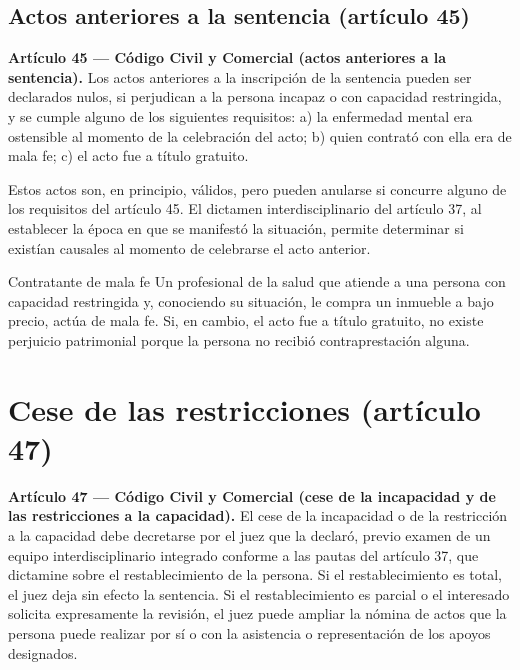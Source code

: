 \documentclass[12pt,oneside]{book}
\begin{document}
\subsection{Actos anteriores a la sentencia (artículo 45)}

\begin{important}
\textbf{Artículo 45 --- Código Civil y Comercial (actos anteriores a la sentencia).} Los actos anteriores a la inscripción de la sentencia pueden ser declarados nulos, si perjudican a la persona incapaz o con capacidad restringida, y se cumple alguno de los siguientes requisitos: a) la enfermedad mental era ostensible al momento de la celebración del acto; b) quien contrató con ella era de mala fe; c) el acto fue a título gratuito.
\end{important}

Estos actos son, en principio, válidos, pero pueden anularse si concurre alguno de los requisitos del artículo 45. El dictamen interdisciplinario del artículo 37, al establecer la época en que se manifestó la situación, permite determinar si existían causales al momento de celebrarse el acto anterior.

\begin{example}{Contratante de mala fe}
Un profesional de la salud que atiende a una persona con capacidad restringida y, conociendo su situación, le compra un inmueble a bajo precio, actúa de mala fe. Si, en cambio, el acto fue a título gratuito, no existe perjuicio patrimonial porque la persona no recibió contraprestación alguna.
\end{example}

\section{Cese de las restricciones (artículo 47)}

\begin{important}
\textbf{Artículo 47 --- Código Civil y Comercial (cese de la incapacidad y de las restricciones a la capacidad).} El cese de la incapacidad o de la restricción a la capacidad debe decretarse por el juez que la declaró, previo examen de un equipo interdisciplinario integrado conforme a las pautas del artículo 37, que dictamine sobre el restablecimiento de la persona. Si el restablecimiento es total, el juez deja sin efecto la sentencia. Si el restablecimiento es parcial o el interesado solicita expresamente la revisión, el juez puede ampliar la nómina de actos que la persona puede realizar por sí o con la asistencia o representación de los apoyos designados.
\end{important}
\end{document}
